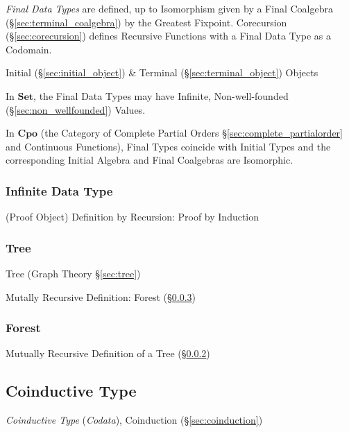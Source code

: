 \emph{Final Data Types} are defined, up to Isomorphism given by a
Final Coalgebra (\S\ref{sec:terminal_coalgebra}) by the Greatest
Fixpoint. Corecursion (\S\ref{sec:corecursion}) defines Recursive
Functions with a Final Data Type as a Codomain.

Initial (\S\ref{sec:initial_object}) \& Terminal
(\S\ref{sec:terminal_object}) Objects

In $\mathbf{Set}$, the Final Data Types may have Infinite,
Non-well-founded (\S\ref{sec:non_wellfounded}) Values.

In $\mathbf{Cpo}$ (the Category of Complete Partial Orders
\S\ref{sec:complete_partialorder} and Continuous Functions), Final
Types coincide with Initial Types and the corresponding Initial
Algebra and Final Coalgebras are Isomorphic.



\subsubsection{Infinite Data Type}\label{sec:infinite_datatype}

(Proof Object) Definition by Recursion: Proof by Induction



\subsubsection{Tree}\label{sec:tree_type}

Tree (Graph Theory \S\ref{sec:tree})

Mutally Recursive Definition: Forest (\S\ref{sec:forest_type})



\subsubsection{Forest}\label{sec:forest_type}

Mutually Recursive Definition of a Tree (\S\ref{sec:tree_type})



\subsection{Coinductive Type}\label{sec:coinductive_type}

\emph{Coinductive Type} (\emph{Codata}), Coinduction
(\S\ref{sec:coinduction})

